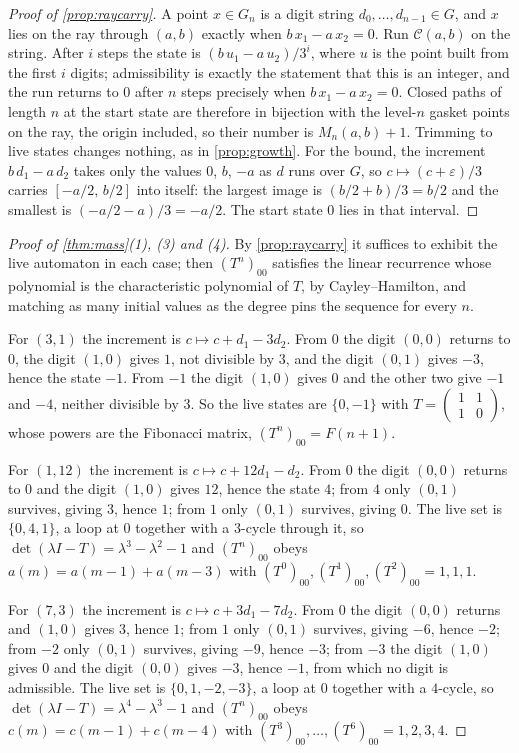 \documentclass[11pt]{amsart}
\theoremstyle{definition}
\theoremstyle{remark}
\begin{document}
\begin{proof}[Proof of \cref{prop:raycarry}]
A point $x\in G_n$ is a digit string $d_0,\dots,d_{n-1}\in G$, and $x$ lies on the ray through $(a,b)$ exactly when $b\,x_1-a\,x_2=0$. Run $\mathcal{C}(a,b)$ on the string. After $i$ steps the state is $(b\,u_1-a\,u_2)/3^i$, where $u$ is the point built from the first $i$ digits; admissibility is exactly the statement that this is an integer, and the run returns to $0$ after $n$ steps precisely when $b\,x_1-a\,x_2=0$. Closed paths of length $n$ at the start state are therefore in bijection with the level-$n$ gasket points on the ray, the origin included, so their number is $M_n(a,b)+1$. Trimming to live states changes nothing, as in \cref{prop:growth}. For the bound, the increment $b\,d_1-a\,d_2$ takes only the values $0$, $b$, $-a$ as $d$ runs over $G$, so $c\mapsto(c+\varepsilon)/3$ carries $[-a/2,\,b/2]$ into itself: the largest image is $(b/2+b)/3=b/2$ and the smallest is $(-a/2-a)/3=-a/2$. The start state $0$ lies in that interval.
\end{proof}

\begin{proof}[Proof of \cref{thm:mass}(1), (3) and (4)]
By \cref{prop:raycarry} it suffices to exhibit the live automaton in each case; then $(T^n)_{00}$ satisfies the linear recurrence whose polynomial is the characteristic polynomial of $T$, by Cayley--Hamilton, and matching as many initial values as the degree pins the sequence for every $n$.

For $(3,1)$ the increment is $c\mapsto c+d_1-3d_2$. From $0$ the digit $(0,0)$ returns to $0$, the digit $(1,0)$ gives $1$, not divisible by $3$, and the digit $(0,1)$ gives $-3$, hence the state $-1$. From $-1$ the digit $(1,0)$ gives $0$ and the other two give $-1$ and $-4$, neither divisible by $3$. So the live states are $\{0,-1\}$ with $T=\left(\begin{smallmatrix}1&1\\1&0\end{smallmatrix}\right)$, whose powers are the Fibonacci matrix, $(T^n)_{00}=F(n+1)$.

For $(1,12)$ the increment is $c\mapsto c+12d_1-d_2$. From $0$ the digit $(0,0)$ returns to $0$ and the digit $(1,0)$ gives $12$, hence the state $4$; from $4$ only $(0,1)$ survives, giving $3$, hence $1$; from $1$ only $(0,1)$ survives, giving $0$. The live set is $\{0,4,1\}$, a loop at $0$ together with a $3$-cycle through it, so $\det(\lambda I-T)=\lambda^3-\lambda^2-1$ and $(T^n)_{00}$ obeys $a(m)=a(m-1)+a(m-3)$ with $(T^0)_{00},(T^1)_{00},(T^2)_{00}=1,1,1$.

For $(7,3)$ the increment is $c\mapsto c+3d_1-7d_2$. From $0$ the digit $(0,0)$ returns and $(1,0)$ gives $3$, hence $1$; from $1$ only $(0,1)$ survives, giving $-6$, hence $-2$; from $-2$ only $(0,1)$ survives, giving $-9$, hence $-3$; from $-3$ the digit $(1,0)$ gives $0$ and the digit $(0,0)$ gives $-3$, hence $-1$, from which no digit is admissible. The live set is $\{0,1,-2,-3\}$, a loop at $0$ together with a $4$-cycle, so $\det(\lambda I-T)=\lambda^4-\lambda^3-1$ and $(T^n)_{00}$ obeys $c(m)=c(m-1)+c(m-4)$ with $(T^3)_{00},\dots,(T^6)_{00}=1,2,3,4$.
\end{proof}
\end{document}
